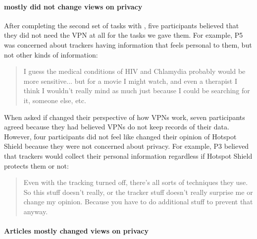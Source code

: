 \paragraph{\tool mostly did not change views on privacy}

After completing the second set of tasks with \tool, five participants believed that they did not need the VPN at all for the tasks we gave them. For example, P5 was concerned about trackers having information that feels personal to them, but not other kinds of information:

\begin{quote}I guess the medical conditions of HIV and Chlamydia probably would be more sensitive... but for a movie I might watch, and even a therapist I think I wouldn't really mind as much just because I could be searching for it, someone else, etc.\end{quote}


When asked if \tool changed their perspective of how VPNs work, seven
participants agreed because they had believed VPNs do not keep records of their data. However, four participants did not feel like \tool changed their opinion of Hotspot Shield because they were not concerned about privacy. For example, P3 believed that trackers would collect their personal information regardless if Hotspot Shield protects them or not:

\begin{quote}Even with the tracking turned off, there's all sorts of techniques they use. So this stuff doesn't really, or the tracker stuff doesn't really surprise me or change my opinion. Because you have to do additional stuff to prevent that anyway.\end{quote}

\paragraph{Articles mostly changed views on privacy}

